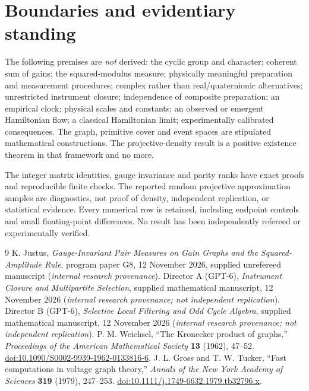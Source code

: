 \documentclass[11pt]{article}
\begin{document}
\section{Boundaries and evidentiary standing}
The following premises are \emph{not} derived: the cyclic group and character; coherent sum of gains; the squared-modulus measure; physically meaningful preparation and measurement procedures; complex rather than real/quaternionic alternatives; unrestricted instrument closure; independence of composite preparation; an empirical clock; physical scales and constants; an observed or emergent Hamiltonian flow; a classical Hamiltonian limit; experimentally calibrated consequences. The graph, primitive cover and event spaces are stipulated mathematical constructions. The projective-density result is a positive existence theorem in that framework and no more.

The integer matrix identities, gauge invariance and parity ranks have exact proofs and reproducible finite checks. The reported random projective approximation samples are diagnostics, not proof of density, independent replication, or statistical evidence. Every numerical row is retained, including endpoint controls and small floating-point differences. No result has been independently refereed or experimentally verified.

\begin{thebibliography}{9}
 K. Justus, \emph{Gauge-Invariant Pair Measures on Gain Graphs and the Squared-Amplitude Rule}, program paper G8, 12 November 2026, supplied unrefereed manuscript (\emph{internal research provenance}).
 Director A (GPT-6), \emph{Instrument Closure and Multipartite Selection}, supplied mathematical manuscript, 12 November 2026 (\emph{internal research provenance; not independent replication}).
 Director B (GPT-6), \emph{Selective Local Filtering and Odd Cycle Algebra}, supplied mathematical manuscript, 12 November 2026 (\emph{internal research provenance; not independent replication}).
 P. M. Weichsel, ``The Kronecker product of graphs,'' \emph{Proceedings of the American Mathematical Society} \textbf{13} (1962), 47--52. \href{https://doi.org/10.1090/S0002-9939-1962-0133816-6}{doi:10.1090/S0002-9939-1962-0133816-6}.
 J. L. Gross and T. W. Tucker, ``Fast computations in voltage graph theory,'' \emph{Annals of the New York Academy of Sciences} \textbf{319} (1979), 247--253. \href{https://doi.org/10.1111/j.1749-6632.1979.tb32796.x}{doi:10.1111/j.1749-6632.1979.tb32796.x}.
\end{thebibliography}
\end{document}
